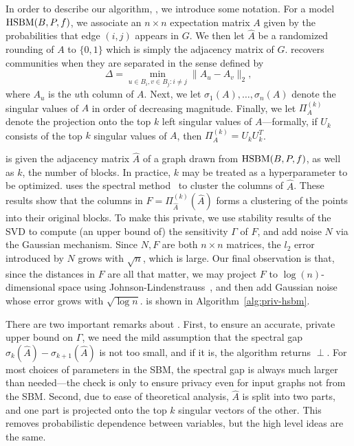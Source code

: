 In order to describe our algorithm, \dpcom{}, we introduce some notation. For a model $\textnormal{HSBM}{}(B,P,f)$, we associate an $n \times n$ expectation matrix $A$ given by the probabilities that edge $(i,j)$ appears in $G$. We then let $\hat{A}$ be a randomized rounding of $A$ to $\{0,1\}$ which is simply the adjacency matrix of $G$. \dpcom{} recovers communities when they are separated in the sense defined by 
\[
    \Delta = \min_{u \in B_i, v \in B_j : i \neq j} \|A_u - A_v\|_2,
\]
where $A_u$ is the $u$th column of $A$. Next, we let $\sigma_1(A), \ldots, \sigma_n(A)$ denote the singular values of $A$ in order of decreasing magnitude. Finally, we let $\Pi_A^{(k)}$ denote the projection onto the top $k$ left singular values of $A$---formally, if $U_k$ consists of the top $k$ singular values of $A$, then $\Pi_A^{(k)} = U_kU_k^T$.

\dpcom{} is given the adjacency matrix $\hat{A}$ of a graph drawn from $\textnormal{HSBM}(B,P,f)$, as well as $k$, the number of blocks. In practice, $k$ may be treated as a hyperparameter to be optimized. \dpcom{} uses the spectral method~\citep{mcsherry2001spectral, vu2014simple} to cluster the columns of $\hat{A}$. These results show that the columns in $F = \Pi_{\hat{A}}^{(k)}(\hat{A})$ forms a clustering of the points into their original blocks. To make this private, we use stability results of the SVD to compute (an upper bound of) the sensitivity $\Gamma$ of $F$, and add noise $N$ via the Gaussian mechanism. Since $N,F$ are both $n \times n$ matrices, the $l_2$ error introduced by $N$ grows with $\sqrt{n}$, which is large. Our final observation is that, since the distances in $F$ are all that matter, we may project $F$ to $\log(n)$-dimensional space using Johnson-Lindenstrauss~\citep{johnson1984extensions}, and then add Gaussian noise whose error grows with $\sqrt{\log n}$. \dpcom{} is shown in Algorithm~\ref{alg:priv-hsbm}.

There are two important remarks about \dpcom{}. First, to ensure an accurate, private upper bound on $\Gamma$, we need the mild assumption that the spectral gap $\sigma_k(\hat{A}) - \sigma_{k+1}(\hat{A})$ is not too small, and if it is, the algorithm returns $\perp$. For most choices of parameters in the SBM, the spectral gap is always much larger than needed---the check is only to ensure privacy even for input graphs not from the SBM. Second, due to ease of theoretical analysis, $\hat{A}$ is split into two parts, and one part is projected onto the top $k$ singular vectors of the other. This removes probabilistic dependence between variables, but the high level ideas are the same.

